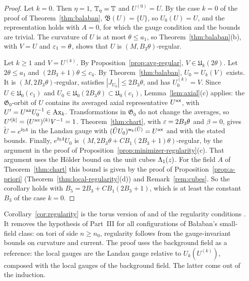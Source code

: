 \begin{proof}
Let $k=0$. Then $\eta=1$, $\mathbb T_\eta=\mathbb T$ and $U^{(0)}=U$. By the case $k=0$ of the proof of Theorem~\ref{thm:balaban}, $\mathfrak B(U)=\{U\}$, so $U_0(U)=U$, and the representation holds with $A=0$, for which the gauge condition and the bounds are trivial. The curvature of $U$ is at most $\theta\le a_1$, so Theorem~\ref{thm:balaban}(b), with $V=U$ and $\varepsilon_1=\theta$, shows that $U$ is $(M,B_3\theta)$-regular.

Let $k\ge1$ and $V=U^{(k)}$. By Proposition~\ref{prop:avg-regular}, $V\in\mathfrak U_k(2\theta)$. Let $2\theta\le a_1$ and $(2B_3+1)\theta\le c_4$. By Theorem~\ref{thm:balaban}, $U_0=U_k(V)$ exists. It is $(M,2B_3\theta)$-regular, satisfies $|J_{U_0}|\le2B_3\theta$, and has $U_0^{(k)}=V$. Since $U\in\mathfrak U_0(c_1)$ and $U_0\in\mathfrak U_0(2B_3\theta)\subset\mathfrak U_0(c_1)$, Lemma~\ref{lem:axial}(c) applies: the $\mathfrak G_0$-orbit of $U$ contains its averaged axial representative $U^{\rm ax}$, with $U'=U^{\rm ax}U_0^{-1}\in\mathrm{Ax}_k$. Transformations in $\mathfrak G_0$ do not change the averages, so $U'^{[k]}=(U^{\rm ax})^{(k)}V^{-1}=1$. Theorem~\ref{thm:chart}, with $\varepsilon=2B_3\theta$ and $\beta=0$, gives $\tilde U=e^{\ii\eta A}$ in the Landau gauge with $(\tilde UU_0)^{\mathsf w_k(\tilde U)}=U^{\rm ax}$ and with the stated bounds. Finally, $e^{\ii\eta A}U_0$ is $(M,2B_3\theta+CB_1(2B_3+1)\theta)$-regular, by the argument in the proof of Proposition~\ref{prop:minimizer-regularity}(c). That argument uses the H\"older bound on the unit cubes $\Lambda_1(z)$. For the field $A$ of Theorem~\ref{thm:chart} this bound is given by the proof of Proposition~\ref{prop:a-priori} (Theorem~\ref{thm:local-regularity}(d)) and Remark~\ref{rem:cubes}. So the corollary holds with $B_5=2B_3+CB_1(2B_3+1)$, which is at least the constant $B_3$ of the case $k=0$.
\end{proof}

Corollary~\ref{cor:regularity} is the torus version of \cite[Sect.~F, Prop.~6]{BalReg} and of the regularity conditions \cite[(3.35)--(3.36)]{BalBackground}. It removes the hypothesis of Part~III for all configurations of Ba\l aban's small-field class: on tori of side $n\ge n_0$, regularity follows from the gauge-invariant bounds on curvature and current. The proof uses the background field as a reference: the local gauges are the Landau gauge relative to $U_k(U^{(k)})$, composed with the local gauges of the background field. The latter come out of the induction.

